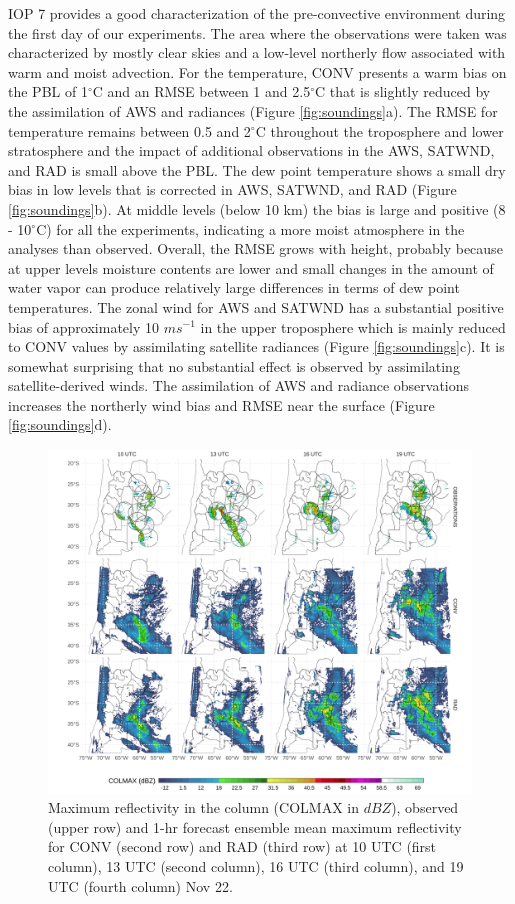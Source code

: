 \documentclass[final,5p,times,twocolumn,authoryear]{elsarticle} %
\begin{document}
IOP 7 provides a good characterization of the pre-convective environment during the first day of our experiments. The area where the observations were taken was characterized by mostly clear skies and a low-level northerly flow associated with warm and moist advection. For the temperature, CONV presents a warm bias on the PBL of 1\(^{\circ}\)C and an RMSE between 1 and 2.5\(^{\circ}\)C that is slightly reduced by the assimilation of AWS and radiances (Figure \ref{fig:soundings}a). The RMSE for temperature remains between 0.5 and 2\(^{\circ}\)C throughout the troposphere and lower stratosphere and the impact of additional observations in the AWS, SATWND, and RAD is small above the PBL. The dew point temperature shows a small dry bias in low levels that is corrected in AWS, SATWND, and RAD (Figure \ref{fig:soundings}b). At middle levels (below 10 km) the bias is large and positive (8 - 10\(^{\circ}\)C) for all the experiments, indicating a more moist atmosphere in the analyses than observed. Overall, the RMSE grows with height, probably because at upper levels moisture contents are lower and small changes in the amount of water vapor can produce relatively large differences in terms of dew point temperatures. The zonal wind for AWS and SATWND has a substantial positive bias of approximately 10 \(ms^{-1}\) in the upper troposphere which is mainly reduced to CONV values by assimilating satellite radiances (Figure \ref{fig:soundings}c). It is somewhat surprising that no substantial effect is observed by assimilating satellite-derived winds. The assimilation of AWS and radiance observations increases the northerly wind bias and RMSE near the surface (Figure \ref{fig:soundings}d).



\begin{figure}[h]
\includegraphics[width=1\linewidth]{../figures/dbz-mean-1} \caption{Maximum reflectivity in the column (COLMAX in \(dBZ\)), observed (upper row) and 1-hr forecast ensemble mean maximum reflectivity for CONV (second row) and RAD (third row) at 10 UTC (first column), 13 UTC (second column), 16 UTC (third column), and 19 UTC (fourth column) Nov 22.}\label{fig:dbz-mean}
\end{figure}
\end{document}
